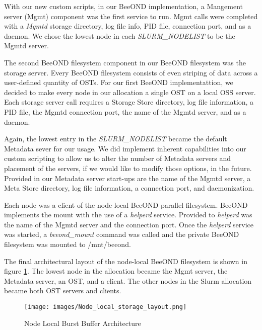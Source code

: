 With our new custom scripts, in our BeeOND implementation, a Mangement server (Mgmt) component was the first service to run.  Mgmt calls were completed with a \textit {Mgmtd} storage directory, log file info, PID file, connection port, and as a daemon.  We chose the lowest node in each \textit {SLURM\_NODELIST} to be the Mgmtd server.

The second BeeOND filesystem component in our BeeOND filesystem  was the storage server.  Every BeeOND filesystem consists of even striping of data across a user-defined quantity of OSTs.  For our first BeeOND implementattion, we decided to make every node in our allocation a single OST on a local OSS server.  Each storage server call requires a Storage Store directory, log file information, a PID file, the Mgmtd connection port, the name of the Mgmtd server, and as a daemon. 

Again, the lowest entry in the \textit{SLURM\_NODELIST} became the default Metadata sever for our usage.  We did implement inherent capabilities into our custom scripting to allow us to alter the number of Metadata servers and placement of the servers, if we would like to modify those options, in the future.  Provided in our Metadata server start-ups are the name of the Mgmtd server, a Meta Store directory, log file information, a connection port, and daemonization.

Each node was a client of the node-local BeeOND parallel filesystem.  BeeOND implements the mount with the use of a \textit{helperd} service.  Provided to \textit{helperd} was the name of the Mgmtd server and the connection port.  Once the \textit {helperd} service was started, a \textit{beeond\_mount} command was called and the private BeeOND filesystem was mounted to /mnt/beeond.  
 
The final architectural layout of the node-local BeeOND filesystem is shown in figure \ref{fig:Node_local_storage_layout}.  The lowest node in the allocation became the Mgmt server, the Metadata server, an OST, and a client.  The other nodes in the Slurm allocation became both OST servers and clients.

\begin{figure}[!htb]
  \centerline{\texttt{[image: images/Node\_local\_storage\_layout.png]}}
  \caption{Node Local Burst Buffer Architecture}
  \label{fig:Node_local_storage_layout}
\end{figure}


